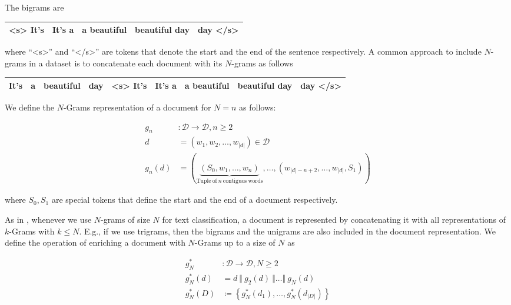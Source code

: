 The bigrams are

\begin{center}
\begin{tabular}{|c|c|c|c|c|}
\hline
<s> It's & It's a & a beautiful & beautiful day & day </s> \\
\hline
\end{tabular}
\end{center}

where ``<s>'' and ``</s>'' are tokens that denote the start and the end of the
sentence respectively. 
A common approach to include $N$-grams in a dataset is
to concatenate each document with its $N$-grams as follows 

\begin{center}
\begin{tabular}{|c|c|c|c|c|c|c|c|c|}
\hline
It's & a & beautiful & day & <s> It's & It's a & a beautiful & beautiful day &

day </s> \\
\hline
\end{tabular}
\end{center}

We define the $N$-Grams representation of a document for $N=n$ as follows:

\begin{equation*}
\begin{split}
g_n &:  \mathcal{D} \to \mathcal{D}, n \geq 2 \\
d &= (w_1,w_2,\ldots,w_{|d|}) \in \mathcal{D} \\
g_n(d) &=  (\underbrace{(S_0,w_1, \ldots,
w_n)}_{\mathrm{Tuple~of}~n\mathrm{~contiguos~words}}, \ldots,
(w_{|d|-n+2},\ldots,w_{|d|},S_1))
\end{split}
\end{equation*}

where $S_0, S_1$ are special tokens that define the start
and the end of a document respectively.

As in \cite{wang2012baselines, furnkranz1998study}, whenever we use $N$-grams of
size $N$ for text classification, a document is represented by concatenating it
with all representations of $k$-Grams with $k \leq N$. E.g., if we use trigrams, then the bigrams and the
unigrams are also included in the document representation. 
We define the operation of enriching a document with $N$-Grams up to a
size of $N$ as


\begin{equation*}
\begin{split}
g_N^* &: \mathcal{D} \to \mathcal{D}, N \geq 2 \\
g_N^*(d) &= d~\Vert~g_2(d)~\Vert \ldots \Vert~g_N(d) \\
g_N^*(D) &\coloneqq \left\{g_N^*(d_1),\ldots,g_N^*(d_{|D|})\right\}
\end{split}
\end{equation*}

